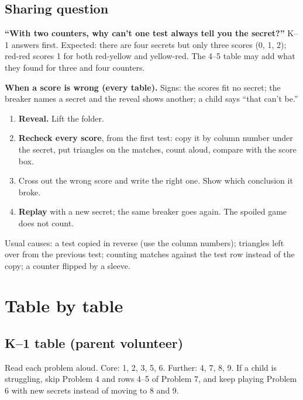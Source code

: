 \documentclass[11pt]{article}
\begin{document}
\subsection{Sharing question}
\textbf{``With two counters, why can't one test always tell you the secret?''} K--1 answers first. Expected: there are four secrets but only three scores (0, 1, 2); red-red scores 1 for both red-yellow and yellow-red. The 4--5 table may add what they found for three and four counters.

\begin{tcolorbox}[gbox]
\textbf{When a score is wrong (every table).} Signs: the scores fit no secret; the breaker names a secret and the reveal shows another; a child says ``that can't be.''
\begin{enumerate}
\item \textbf{Reveal.} Lift the folder.
\item \textbf{Recheck every score}, from the first test: copy it by column number under the secret, put triangles on the matches, count aloud, compare with the score box.
\item Cross out the wrong score and write the right one. Show which conclusion it broke.
\item \textbf{Replay} with a new secret; the same breaker goes again. The spoiled game does not count.
\end{enumerate}
Usual causes: a test copied in reverse (use the column numbers); triangles left over from the previous test; counting matches against the test row instead of the copy; a counter flipped by a sleeve.
\end{tcolorbox}

\section{Table by table}

\subsection{K--1 table (parent volunteer)}
Read each problem aloud. Core: 1, 2, 3, 5, 6. Further: 4, 7, 8, 9. If a child is struggling, skip Problem 4 and rows 4--5 of Problem 7, and keep playing Problem 6 with new secrets instead of moving to 8 and 9.
\end{document}
